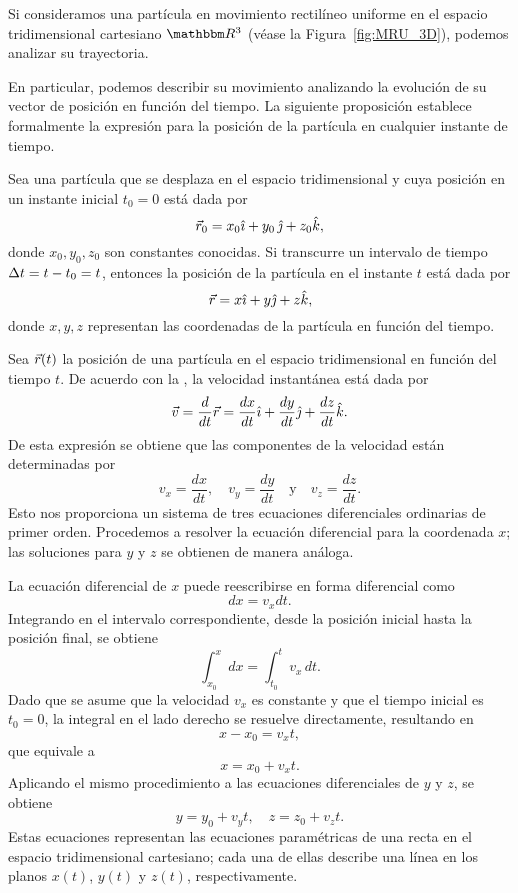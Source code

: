 Si consideramos una partícula en movimiento rectilíneo uniforme en el espacio tridimensional cartesiano $\RR[3]$ (véase la Figura~\ref{fig:MRU_3D}), podemos analizar su trayectoria.

En particular, podemos describir su movimiento analizando la evolución de su vector de posición en función del tiempo. La siguiente proposición establece formalmente la expresión para la posición de la partícula en cualquier instante de tiempo.

\begin{proposition}{}{}
    Sea una partícula que se desplaza en el espacio tridimensional y cuya posición en un instante inicial $t_0 = 0$ está dada por  
    $$\vec{r}_0 = x_0\hat{\imath} + y_0\,\hat{\jmath} + z_0\hat{k},$$
    donde $x_0, y_0, z_0$ son constantes conocidas. Si transcurre un intervalo de tiempo $\Delta t = t - t_0 = t$, entonces la posición de la partícula en el instante $t$ está dada por  
    $$\vec{r} = x\hat{\imath} + y\hat{\jmath} + z\hat{k},$$
    donde $x, y, z$ representan las coordenadas de la partícula en función del tiempo.
    \begin{demo}
        Sea $\vec{r}(t)$ la posición de una partícula en el espacio tridimensional en función del tiempo $t$. De acuerdo con la , la velocidad instantánea está dada por
        $$\vec{v} = \frac{d}{dt}\vec{r} = \frac{dx}{dt}\hat{\imath} + \frac{dy}{dt}\hat{\jmath} + \frac{dz}{dt}\hat{k}.$$
        De esta expresión se obtiene que las componentes de la velocidad están determinadas por
        $$v_x = \frac{dx}{dt}, \quad v_y = \frac{dy}{dt} \quad \text{y} \quad v_z = \frac{dz}{dt}.$$
        Esto nos proporciona un sistema de tres ecuaciones diferenciales ordinarias de primer orden. Procedemos a resolver la ecuación diferencial para la coordenada $x$; las soluciones para $y$ y $z$ se obtienen de manera análoga.
    
        La ecuación diferencial de $x$ puede reescribirse en forma diferencial como
        $$dx = v_x dt.$$
        Integrando en el intervalo correspondiente, desde la posición inicial hasta la posición final, se obtiene
        $$\int_{x_0}^{x} dx = \int_{t_0}^{t} v_x \, dt.$$
        Dado que se asume que la velocidad $v_x$ es constante y que el tiempo inicial es $t_0 = 0$, la integral en el lado derecho se resuelve directamente, resultando en
        $$x - x_0 = v_x t,$$
        que equivale a
        $$x = x_0 + v_x t.$$
        Aplicando el mismo procedimiento a las ecuaciones diferenciales de $y$ y $z$, se obtiene
        $$y = y_0 + v_y t, \quad z = z_0 + v_z t.$$
        Estas ecuaciones representan las ecuaciones paramétricas de una recta en el espacio tridimensional cartesiano; cada una de ellas describe una línea en los planos $x(t)$, $y(t)$ y $z(t)$, respectivamente.  
    

\end{demo}
\end{proposition}
